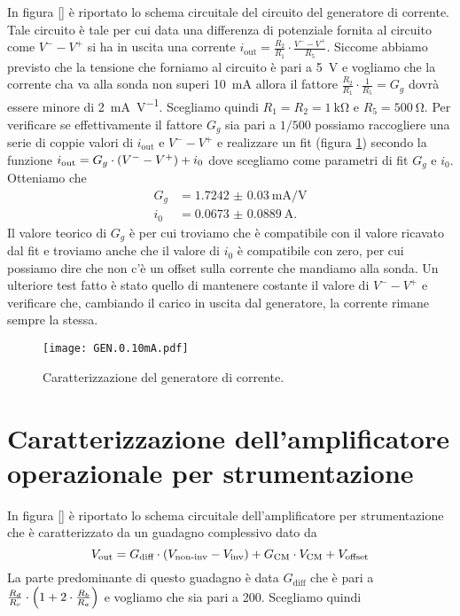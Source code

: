 \documentclass[
    prl,
    reprint, 
    superscriptaddress, 
    altaffilletter, 
    amsmath, 
    amssymb, 
    a4paper,
    varvw]{revtex4-2}
\begin{document}
In figura \ref{} è riportato lo schema circuitale del circuito del generatore di corrente. Tale circuito è tale per cui data una differenza di potenziale fornita al circuito come $V^{-}-V^{+}$ si ha in uscita una corrente $i_\text{out}=\frac{R_2}{R_1}\cdot \frac{V^--V^+}{R_5}$. Siccome abbiamo previsto che la tensione che forniamo al circuito è pari a \SI{5}{\volt} e vogliamo che la corrente cha va alla sonda non superi \SI{10}{\milli\ampere} allora il fattore $\frac{R_2}{R_1}\cdot \frac{1}{R_5}=G_g$ dovrà essere minore di \SI{2}{\milli\ampere\per\volt}. Scegliamo quindi $R_{1}=R_{2}=\SI{1}{\kilo\ohm}$ e $R_{5}=\SI{500}{\ohm}$. Per verificare se effettivamente il fattore $G_g$ sia pari a $1/500$ possiamo raccogliere una serie di coppie valori di $i_\text{out}$ e $V^{-}-V^{+}$ e realizzare un fit (figura \ref{fig:gen_i_model}) secondo la funzione $i_\text{out}=G_g\cdot \qty(V^--V^+) + i_0$ dove scegliamo come parametri di fit $G_{g}$ e $i_0$. Otteniamo che 
\begin{align*}
    G_g &=\SI{1.7242(300)}{\milli\ampere \per\volt}  \\
    i_0 &= \SI{0.0673(889)}{\ampere}.
\end{align*}
Il valore teorico di $G_g$ è \SI{}{} per cui troviamo che è compatibile con il valore ricavato dal fit e troviamo anche che il valore di $i_0$ è compatibile con zero, per cui possiamo dire che non c'è un offset sulla corrente che mandiamo alla sonda.
Un ulteriore test fatto è stato quello di mantenere costante il valore di $V^--V^+$ e verificare che, cambiando il carico in uscita dal generatore, la corrente rimane sempre la stessa.

\begin{figure}
    \centering
    \texttt{[image: GEN.0.10mA.pdf]}
    \caption{Caratterizzazione del generatore di corrente.}\label{fig:gen_i_model}
\end{figure}

\section{Caratterizzazione dell'amplificatore operazionale per strumentazione}\label{sec:appendix_strum_opamp}
In figura \ref{} è riportato lo schema circuitale dell'amplificatore per strumentazione che  è caratterizzato da un guadagno complessivo dato da \begin{equation}
    V_\text{out} = G_\text{diff}\cdot \qty(V_\text{non-inv}-V_\text{inv}) +  G_\text{CM}\cdot V_\text{CM} + V_\text{offset} 
\end{equation}
La parte predominante di questo guadagno è data $G_\text{diff}$ che è pari a $\frac{R_d}{R_c}\cdot \qty(1+2\cdot \frac{R_b}{R_a})$ e vogliamo che sia pari a 200. Scegliamo quindi 
\end{document}
